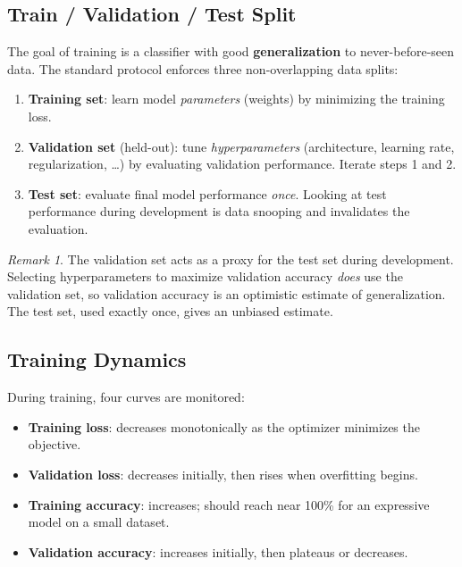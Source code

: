 \documentclass[11pt,a4paper]{article}
\theoremstyle{definition}
\theoremstyle{plain}
\theoremstyle{remark}
\newtheorem*{remark}{Remark}
\begin{document}
\subsection{Train / Validation / Test Split}

The goal of training is a classifier with good \textbf{generalization} to never-before-seen data. The standard protocol enforces three non-overlapping data splits:

\begin{enumerate}
    \item \textbf{Training set}: learn model \emph{parameters} (weights) by minimizing the training loss.
    \item \textbf{Validation set} (held-out): tune \emph{hyperparameters} (architecture, learning rate, regularization, \ldots) by evaluating validation performance. Iterate steps 1 and 2.
    \item \textbf{Test set}: evaluate final model performance \emph{once}. Looking at test performance during development is data snooping and invalidates the evaluation.
\end{enumerate}

\begin{remark}
The validation set acts as a proxy for the test set during development. Selecting hyperparameters to maximize validation accuracy \emph{does} use the validation set, so validation accuracy is an optimistic estimate of generalization. The test set, used exactly once, gives an unbiased estimate.
\end{remark}

\subsection{Training Dynamics}

During training, four curves are monitored:
\begin{itemize}
    \item \textbf{Training loss}: decreases monotonically as the optimizer minimizes the objective.
    \item \textbf{Validation loss}: decreases initially, then rises when overfitting begins.
    \item \textbf{Training accuracy}: increases; should reach near 100\% for an expressive model on a small dataset.
    \item \textbf{Validation accuracy}: increases initially, then plateaus or decreases.
\end{itemize}
\end{document}
